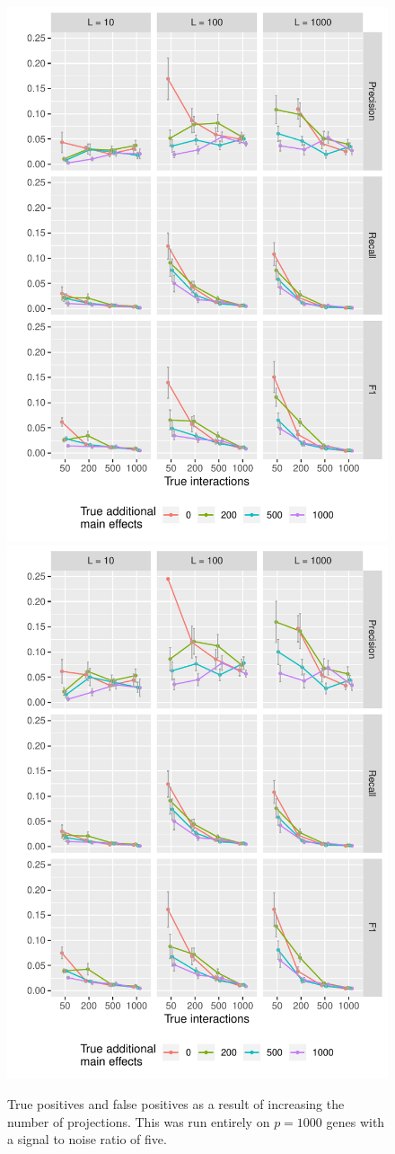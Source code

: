 \begin{figure}
	\begin{minipage}{\linewidth}
	\centering
	\includegraphics[width=0.5\linewidth]{"output/l_diff_n10000_SNR5_tno"}%
	\includegraphics[width=0.5\linewidth]{"output/l_diff_n10000_SNR5_tyes"}
\end{minipage}
\caption{True positives and false positives as a result of increasing the number of projections. This was run entirely on $p = 1000$ genes with a signal to noise ratio of five.}
\end{figure}

